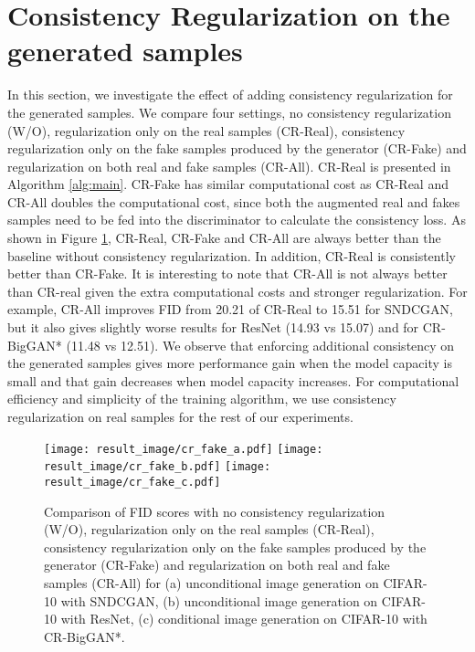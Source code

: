 \documentclass{article} \usepackage{iclr2020_conference,times}
\begin{document}
\section {Consistency Regularization on the generated samples} \label{sec:generated_sample}

\renewcommand{\thefigure}{H\arabic{figure}}
\setcounter{figure}{0}
\renewcommand{\thetable}{H\arabic{table}}
\setcounter{table}{0}

In this section, we investigate the effect of adding consistency regularization for the generated samples.
We compare four settings, no consistency regularization (W/O), regularization only on the real samples (CR-Real),
consistency regularization only on the fake samples produced by the generator (CR-Fake) and regularization on both real and fake samples (CR-All).
CR-Real is presented in Algorithm \ref{alg:main}. 
CR-Fake has similar computational cost as CR-Real and CR-All doubles the computational cost, 
since both the augmented real and fakes samples need to be fed into the discriminator to calculate the consistency loss.
As shown in Figure \ref{fig:cr_fake}, CR-Real, CR-Fake and CR-All are always better than the baseline without consistency regularization.
In addition, CR-Real is consistently better than CR-Fake.
It is interesting to note that CR-All is not always better than CR-real given the extra computational costs and stronger regularization.
For example, CR-All improves FID from 20.21 of CR-Real to 15.51 for SNDCGAN, but it also gives slightly worse results for ResNet  (14.93 vs 15.07)
and for CR-BigGAN* (11.48 vs 12.51).
We observe that enforcing additional consistency on the generated samples gives more performance gain when the model capacity is small and that gain
decreases when model capacity increases.
For computational efficiency and simplicity of the training algorithm, we use consistency regularization on real samples for the rest of our 
experiments. 





\begin{figure}[hbt!]
    \centering
    \texttt{[image: result\_image/cr\_fake\_a.pdf]}
    \texttt{[image: result\_image/cr\_fake\_b.pdf]}
    \texttt{[image: result\_image/cr\_fake\_c.pdf]}
    
    \caption{
    Comparison of FID scores with no consistency regularization (W/O), regularization only on the real samples (CR-Real), consistency regularization only on the fake samples produced by the generator (CR-Fake) and regularization on both real and fake samples (CR-All) for (a) unconditional image generation on CIFAR-10 with SNDCGAN, (b) unconditional image generation on CIFAR-10 with ResNet, (c) conditional image generation on CIFAR-10 with CR-BigGAN*.
    }
    \label{fig:cr_fake}
\end{figure} 
\end{document}
